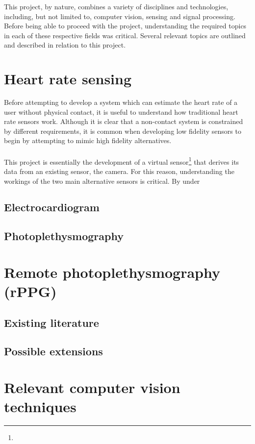 This project, by nature, combines a variety of disciplines and technologies, including, but not limited to, computer vision, sensing and signal processing. 
Before being able to proceed with the project, understanding the required topics in each of these respective fields was critical. Several relevant topics are outlined 
and described in relation to this project.

\section{Heart rate sensing}
Before attempting to develop a system which can estimate the heart rate of a user without physical contact, it is useful to understand how traditional heart rate sensors work.
Although it is clear that a non-contact system is constrained by different requirements, it is common when developing low fidelity sensors to begin by attempting to mimic high fidelity alternatives. \\\\
This project is essentially the development of a virtual sensor\footnote{} that derives its data from an existing sensor, the camera. For this reason, understanding the workings of the two main alternative sensors is critical. By under

\subsection{Electrocardiogram}

\subsection{Photoplethysmography}


\section{Remote photoplethysmography (rPPG)}
\subsection{Existing literature}
\subsection{Possible extensions}

\section{Relevant computer vision techniques}
